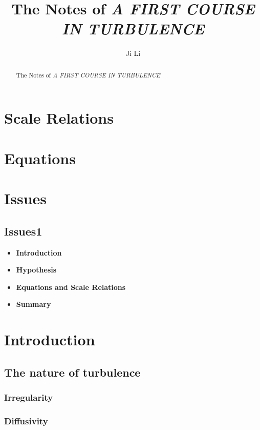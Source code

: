 \documentclass[review]{elsarticle}
\begin{document}
\begin{frontmatter}
    \title{The Notes of \textit{A FIRST COURSE IN TURBULENCE}}
    \author{Ji Li}


    \address{National Key Laboratory of Science and Technology on Aerodynamic Design and Research, Northwestern Polytechnical 
    University, Xi'an, Shaanxi 710072, China}

    \begin{abstract}
        The Notes of \textit{A FIRST COURSE IN TURBULENCE}
    \end{abstract}
\end{frontmatter}

\section{Scale Relations}

\section{Equations}

\section{Issues}
\subsection{Issues1}
\begin{itemize}
    \item \textbf{Introduction}
    \item \textbf{Hypothesis}
    \item \textbf{Equations and Scale Relations}
    \item \textbf{Summary}
\end{itemize}

\section{Introduction}
	\subsection{The nature of turbulence}
		\subsubsection {Irregularity}
		\subsubsection {Diffusivity}
\end{document}
